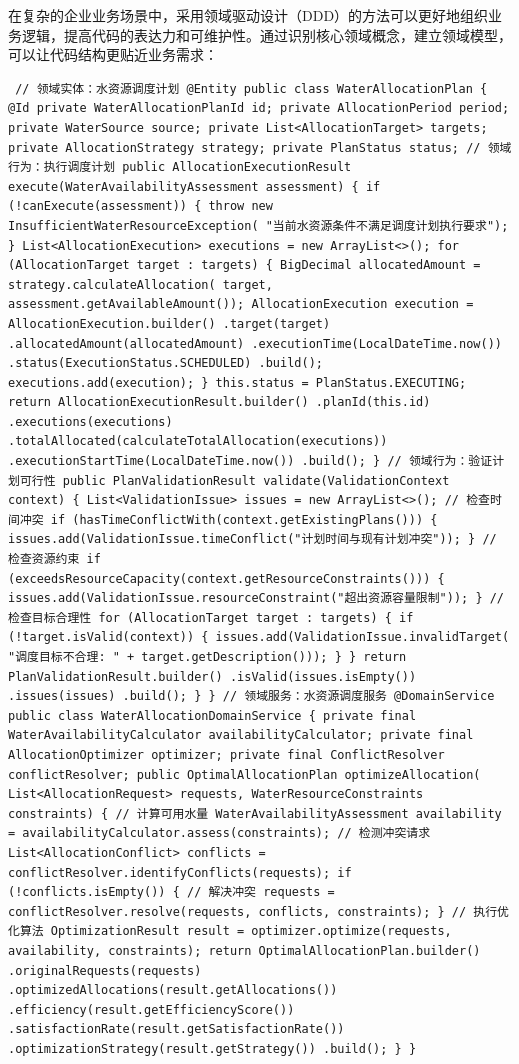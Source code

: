 {{{{{在复杂的企业业务场景中，采用领域驱动设计（DDD）的方法可以更好地组织业务逻辑，提高代码的表达力和可维护性。通过识别核心领域概念，建立领域模型，可以让代码结构更贴近业务需求： \begin{verbatim} // 领域实体：水资源调度计划 @Entity public class WaterAllocationPlan { @Id private WaterAllocationPlanId id; private AllocationPeriod period; private WaterSource source; private List<AllocationTarget> targets; private AllocationStrategy strategy; private PlanStatus status; // 领域行为：执行调度计划 public AllocationExecutionResult execute(WaterAvailabilityAssessment assessment) { if (!canExecute(assessment)) { throw new InsufficientWaterResourceException( "当前水资源条件不满足调度计划执行要求"); } List<AllocationExecution> executions = new ArrayList<>(); for (AllocationTarget target : targets) { BigDecimal allocatedAmount = strategy.calculateAllocation( target, assessment.getAvailableAmount()); AllocationExecution execution = AllocationExecution.builder() .target(target) .allocatedAmount(allocatedAmount) .executionTime(LocalDateTime.now()) .status(ExecutionStatus.SCHEDULED) .build(); executions.add(execution); } this.status = PlanStatus.EXECUTING; return AllocationExecutionResult.builder() .planId(this.id) .executions(executions) .totalAllocated(calculateTotalAllocation(executions)) .executionStartTime(LocalDateTime.now()) .build(); } // 领域行为：验证计划可行性 public PlanValidationResult validate(ValidationContext context) { List<ValidationIssue> issues = new ArrayList<>(); // 检查时间冲突 if (hasTimeConflictWith(context.getExistingPlans())) { issues.add(ValidationIssue.timeConflict("计划时间与现有计划冲突")); } // 检查资源约束 if (exceedsResourceCapacity(context.getResourceConstraints())) { issues.add(ValidationIssue.resourceConstraint("超出资源容量限制")); } // 检查目标合理性 for (AllocationTarget target : targets) { if (!target.isValid(context)) { issues.add(ValidationIssue.invalidTarget( "调度目标不合理: " + target.getDescription())); } } return PlanValidationResult.builder() .isValid(issues.isEmpty()) .issues(issues) .build(); } } // 领域服务：水资源调度服务 @DomainService public class WaterAllocationDomainService { private final WaterAvailabilityCalculator availabilityCalculator; private final AllocationOptimizer optimizer; private final ConflictResolver conflictResolver; public OptimalAllocationPlan optimizeAllocation( List<AllocationRequest> requests, WaterResourceConstraints constraints) { // 计算可用水量 WaterAvailabilityAssessment availability = availabilityCalculator.assess(constraints); // 检测冲突请求 List<AllocationConflict> conflicts = conflictResolver.identifyConflicts(requests); if (!conflicts.isEmpty()) { // 解决冲突 requests = conflictResolver.resolve(requests, conflicts, constraints); } // 执行优化算法 OptimizationResult result = optimizer.optimize(requests, availability, constraints); return OptimalAllocationPlan.builder() .originalRequests(requests) .optimizedAllocations(result.getAllocations()) .efficiency(result.getEfficiencyScore()) .satisfactionRate(result.getSatisfactionRate()) .optimizationStrategy(result.getStrategy()) .build(); } } \end{verbatim} }}}}}
